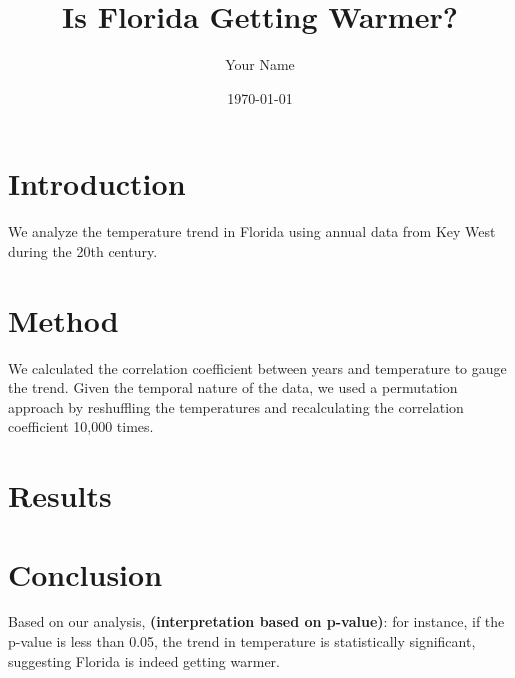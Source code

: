 \documentclass[a4paper,12pt]{article}
\title{Is Florida Getting Warmer?}
\author{Your Name}
\date{\today}
\begin{document}
\maketitle

\section*{Introduction}
We analyze the temperature trend in Florida using annual data from Key West during the 20th century.

\section*{Method}
We calculated the correlation coefficient between years and temperature to gauge the trend. Given the temporal nature of the data, we used a permutation approach by reshuffling the temperatures and recalculating the correlation coefficient 10,000 times.

\section*{Results}


\section*{Conclusion}
Based on our analysis, \textbf{(interpretation based on p-value)}: for instance, if the p-value is less than 0.05, the trend in temperature is statistically significant, suggesting Florida is indeed getting warmer.
\end{document}
